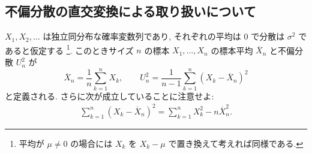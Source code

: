 \documentclass[12pt,twoside]{jarticle}
\newcommand\Xbar{{\overline X}}
\theoremstyle{jplain}
\theoremstyle{jplain}
\theoremstyle{jplain}
\numberwithin{theorem}{section}
\numberwithin{equation}{section}
\numberwithin{figure}{section}
\numberwithin{table}{section}
\begin{document}

\subsection{不偏分散の直交変換による取り扱いについて}
\label{sec:Y_k}

$X_1,X_2,\ldots$ は独立同分布な確率変数列であり, 
それぞれの平均は $0$ で分散は $\sigma^2$ であると仮定する%
\footnote{平均が $\mu\ne 0$ の場合には $X_k$ を $X_k-\mu$ で置き換えて考えれば同様である.}.
このときサイズ $n$ の標本 $X_1,\ldots,X_n$ の標本平均 $\Xbar_n$ と不偏分散 $U_n^2$ が
\[
\Xbar_n = \frac{1}{n} \sum_{k=1}^n X_k, \qquad 
U_n^2 = \frac{1}{n-1}\sum_{k=1}^n (X_k - \Xbar_n)^2
\]
と定義される. さらに次が成立していることに注意せよ:
\begin{align*}
\sum_{k=1}^n (X_k - \Xbar_n)^2 = \sum_{k=1}^n X_k^2 - n\Xbar_n^2.
\end{align*}
\end{document}
